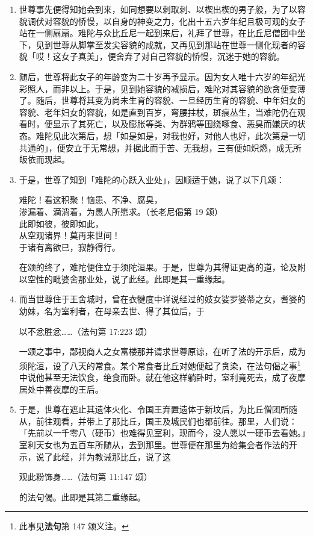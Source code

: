 \begin{enumerate}
\item 世尊事先便得知她会到来，如同想要以刺取刺、以楔出楔的男子般，为了以容貌调伏对容貌的㤭慢，以自身的神变之力，化出十五六岁年纪且极可观的女子站在一侧扇扇。难陀与众比丘尼一起到来后，礼拜了世尊，在比丘尼僧团中坐下，见到世尊从脚掌至发尖容貌的成就，又再见到那站在世尊一侧化现者的容貌「哎！这女子真美」，便舍弃了对自己容貌的㤭慢，沉迷于她的容貌。
\item 随后，世尊将此女子的年龄变为二十岁再予显示。因为女人唯十六岁的年纪光彩照人，而非以上。于是，见到她容貌的减损后，难陀对其容貌的欲贪便变薄了。随后，世尊将其变为尚未生育的容貌、一旦经历生育的容貌、中年妇女的容貌、老年妇女的容貌，如是直到百岁，弯腰拄杖，斑痕丛生，当难陀仍在观看时，便显示了其死亡，以及膨胀等类、为群鸦等围绕啄食、恶臭而嫌厌的状态。难陀见此次第后，想「如是如是，对我也好，对他人也好，此次第是一切共通的」，便安立于无常想，并据此而于苦、无我想，三有便如炽燃，成无所皈依而现起。
\item 于是，世尊了知到「难陀的心跃入业处」，因顺适于她，说了以下几颂：\begin{quoting}难陀！看这积聚！恼患、不净、腐臭，\\渗漏着、滴淌着，为愚人所愿求。（长老尼偈第 19 颂）\\此即如彼，彼即如此，\\从空观诸界！莫再来世间！\\于诸有离欲已，寂静得行。\end{quoting}在颂的终了，难陀便住立于须陀洹果。于是，世尊为其得证更高的道，论及附以空性的毗婆舍那业处，说了此经。此即是其一重缘起。
\item 而当世尊住于王舍城时，曾在衣犍度中详说经过的妓女娑罗婆蒂之女，耆婆的幼妹，名为室利者，在母亲去世、得了其位后，于\begin{quoting}以不忿胜忿……（法句第 17:223 颂）\end{quoting}一颂之事中，鄙视商人之女富楼那并请求世尊原谅，在听了法的开示后，成为须陀洹，设了八天的常食。某个常食者比丘对她便起了贪染，在法句偈之事\footnote{此事见\textbf{法句}第 147 颂义注。}中说他甚至无法饮食，绝食而卧。就在他这样躺卧时，室利竟死去，成了夜摩居处中善夜摩的王后。
\item 于是，世尊在遮止其遗体火化、令国王弃置遗体于新坟后，为比丘僧团所随从，前往观看，并带上了那比丘，国王及城民们也都前往。那里，人们说：「先前以一千零八（硬币）也难得见室利，现而今，没人愿以一硬币去看她。」室利天女也为五百车所随从，去到那里。世尊便在那里为给集会者作法的开示，说了此经，并为教诫那比丘，说了这\begin{quoting}观此粉饰身……（法句第 11:147 颂）\end{quoting}的法句偈。此即是其第二重缘起。\end{enumerate}

